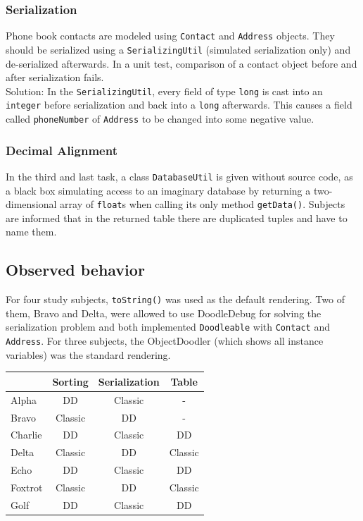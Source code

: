 \documentclass[english]{scrartcl}
\begin{document}
\subsubsection{Serialization}
Phone book contacts are modeled using \texttt{Con\-tact} and \texttt{Address}  objects.
They should be serialized using a \texttt{Ser\-ializ\-ing\-Util} (simulated serialization only) and de-serialized afterwards.
In a unit test, comparison of a contact object before and after serialization fails.\\
Solution: In the \texttt{SerializingUtil}, every field of type \texttt{long} is cast %
into an \texttt{integer} before serialization and back into a \texttt{long} afterwards.
This causes a field called \texttt{phoneNumber} of \texttt{Address} to be changed into some negative value.

\subsubsection{Decimal Alignment}
In the third and last task, a class \texttt{DatabaseUtil} is given without source code, as a black box simulating access to an imaginary database by returning a two-dimensional array of \texttt{float}s when calling its only method \texttt{getData()}.
Subjects are informed that in the returned table there are duplicated tuples and have to name them.

\subsection{Observed behavior}
For four study subjects, \texttt{toString()} was used as the default rendering.
Two of them, Bravo and Delta, were allowed to use DoodleDebug for solving the serialization problem and both implemented \texttt{Doodleable} with \texttt{Contact} and \texttt{Address}.
For three subjects, the ObjectDoodler (which shows all instance variables) was the standard rendering.

\begin{tabular}{l | c c c}
 & \textbf{Sorting} & \textbf{Serialization} & \textbf{Table} \\
\hline
Alpha & DD & Classic & - \\
Bravo & Classic & DD & - \\
Charlie & DD & Classic & DD \\
Delta & Classic & DD & Classic \\
Echo & DD & Classic & DD \\
Foxtrot & Classic & DD & Classic \\
Golf & DD & Classic & DD \\
\end{tabular}
\end{document}
